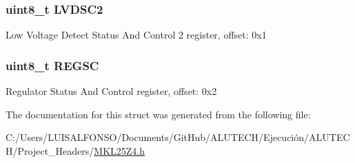 \subsubsection[{L\+V\+D\+S\+C2}]{\setlength{\rightskip}{0pt plus 5cm}uint8\+\_\+t L\+V\+D\+S\+C2}\label{struct_p_m_c___mem_map_a63e1dd6700199a875c987cca4676b084}
Low Voltage Detect Status And Control 2 register, offset\+: 0x1 \hypertarget{struct_p_m_c___mem_map_a9786fdb50c1bad04aedb8b090e2eaddf}{}
\subsubsection[{R\+E\+G\+S\+C}]{\setlength{\rightskip}{0pt plus 5cm}uint8\+\_\+t R\+E\+G\+S\+C}\label{struct_p_m_c___mem_map_a9786fdb50c1bad04aedb8b090e2eaddf}
Regulator Status And Control register, offset\+: 0x2 

The documentation for this struct was generated from the following file\+:\begin{DoxyCompactItemize}
\item 
C\+:/\+Users/\+L\+U\+I\+S\+A\+L\+F\+O\+N\+S\+O/\+Documents/\+Git\+Hub/\+A\+L\+U\+T\+E\+C\+H/\+Ejecución/\+A\+L\+U\+T\+E\+C\+H/\+Project\+\_\+\+Headers/\hyperlink{_m_k_l25_z4_8h}{M\+K\+L25\+Z4.\+h}\end{DoxyCompactItemize}
